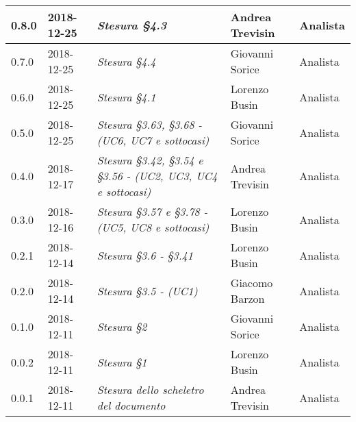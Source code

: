 \begin{longtable}{C{2cm}|C{2.5cm}|C{4.5cm}|C{2.5cm}|C{3cm}}
		0.8.0 & 2018-12-25 & \emph{Stesura §4.3} & Andrea Trevisin & Analista \\
		\hline
		
		0.7.0 & 2018-12-25 & \emph{Stesura §4.4} & Giovanni Sorice & Analista \\
		\hline
		
		0.6.0 & 2018-12-25 & \emph{Stesura §4.1} & Lorenzo Busin & Analista \\
		\hline
		
		0.5.0 & 2018-12-25 & \emph{Stesura §3.63, §3.68 - (UC6, UC7 e sottocasi)} & Giovanni Sorice & Analista \\
		\hline
		
		0.4.0 & 2018-12-17 & \emph{Stesura §3.42, §3.54 e §3.56 - (UC2, UC3, UC4 e sottocasi)} & Andrea Trevisin & Analista \\
		\hline
		
		0.3.0 & 2018-12-16 & \emph{Stesura §3.57 e §3.78 - (UC5, UC8 e sottocasi)} & Lorenzo Busin & Analista \\
		\hline
		
		0.2.1 & 2018-12-14 & \emph{Stesura §3.6 - §3.41} & Lorenzo Busin & Analista \\
		\hline
		
		0.2.0 & 2018-12-14 & \emph{Stesura §3.5 - (UC1)} & Giacomo Barzon & Analista \\
		\hline
		
		0.1.0 & 2018-12-11 & \emph{Stesura §2} & Giovanni Sorice & Analista \\
		\hline
		
		0.0.2 & 2018-12-11 & \emph{Stesura §1} & Lorenzo Busin & Analista \\
		\hline
		
		0.0.1 & 2018-12-11 & \emph{Stesura dello scheletro del documento} & Andrea Trevisin & Analista \\
		
	\end{longtable}



\clearpage